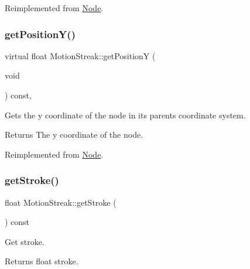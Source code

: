 Reimplemented from \hyperlink{classNode_ae2ab411fb5477789b7b96477b18c0f83}{Node}.

\mbox{\label{classMotionStreak_a05d60b5b380417f870046d8aa5f6626b}} 
\subsubsection{\texorpdfstring{get\+Position\+Y()}{getPositionY()}\hspace{0.1cm}{\footnotesize\ttfamily [2/2]}}
{\footnotesize\ttfamily virtual float Motion\+Streak\+::get\+PositionY (\begin{DoxyParamCaption}\item[{void}]{ }\end{DoxyParamCaption}) const\hspace{0.3cm}{\ttfamily [override]}, {\ttfamily [virtual]}}

Gets the y coordinate of the node in its parent\textquotesingle{}s coordinate system.

\begin{DoxyReturn}{Returns}
The y coordinate of the node. 
\end{DoxyReturn}


Reimplemented from \hyperlink{classNode_ae2ab411fb5477789b7b96477b18c0f83}{Node}.

\mbox{\label{classMotionStreak_adef21bada492d363a843ae275aceebdd}} 
\subsubsection{\texorpdfstring{get\+Stroke()}{getStroke()}\hspace{0.1cm}{\footnotesize\ttfamily [1/2]}}
{\footnotesize\ttfamily float Motion\+Streak\+::get\+Stroke (\begin{DoxyParamCaption}{ }\end{DoxyParamCaption}) const\hspace{0.3cm}{\ttfamily [inline]}}

Get stroke.

\begin{DoxyReturn}{Returns}
float stroke. 
\end{DoxyReturn}
\mbox{\label{classMotionStreak_adef21bada492d363a843ae275aceebdd}} 

